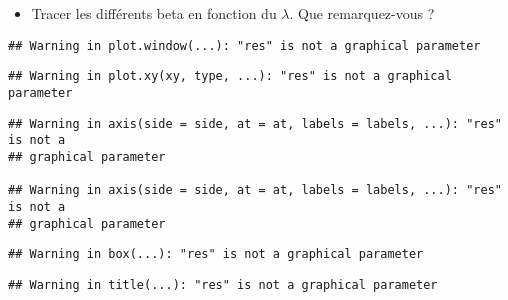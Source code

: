\documentclass[
]{article}
\newenvironment{Shaded}{\begin{snugshade}}{\end{snugshade}}
\newcommand{\AttributeTok}[1]{\textcolor[rgb]{0.77,0.63,0.00}{#1}}
\newcommand{\CommentTok}[1]{\textcolor[rgb]{0.56,0.35,0.01}{\textit{#1}}}
\newcommand{\DecValTok}[1]{\textcolor[rgb]{0.00,0.00,0.81}{#1}}
\newcommand{\FloatTok}[1]{\textcolor[rgb]{0.00,0.00,0.81}{#1}}
\newcommand{\FunctionTok}[1]{\textcolor[rgb]{0.00,0.00,0.00}{#1}}
\newcommand{\NormalTok}[1]{#1}
\newcommand{\OtherTok}[1]{\textcolor[rgb]{0.56,0.35,0.01}{#1}}
\newcommand{\SpecialCharTok}[1]{\textcolor[rgb]{0.00,0.00,0.00}{#1}}
\newcommand{\StringTok}[1]{\textcolor[rgb]{0.31,0.60,0.02}{#1}}
\providecommand{\tightlist}{%
  \setlength{\itemsep}{0pt}\setlength{\parskip}{0pt}}
\begin{document}
\begin{itemize}
\tightlist
\item
  Tracer les différents beta en fonction du \(\lambda\). Que
  remarquez-vous ?
\end{itemize}

\begin{Shaded}
\end{Shaded}

\begin{verbatim}
## Warning in plot.window(...): "res" is not a graphical parameter
\end{verbatim}

\begin{verbatim}
## Warning in plot.xy(xy, type, ...): "res" is not a graphical parameter
\end{verbatim}

\begin{verbatim}
## Warning in axis(side = side, at = at, labels = labels, ...): "res" is not a
## graphical parameter

## Warning in axis(side = side, at = at, labels = labels, ...): "res" is not a
## graphical parameter
\end{verbatim}

\begin{verbatim}
## Warning in box(...): "res" is not a graphical parameter
\end{verbatim}

\begin{verbatim}
## Warning in title(...): "res" is not a graphical parameter
\end{verbatim}
\end{document}
